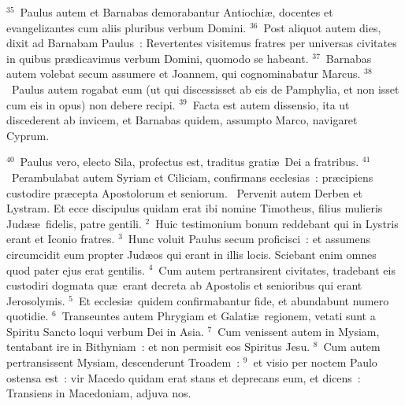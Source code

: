 ${}^{35}$~Paulus autem et Barnabas demorabantur Antiochi\ae , docentes et evangelizantes cum aliis pluribus verbum Domini.
${}^{36}$~Post aliquot autem dies, dixit ad Barnabam Paulus~: Revertentes visitemus fratres per universas civitates in quibus pr\ae dicavimus verbum Domini, quomodo se habeant.
${}^{37}$~Barnabas autem volebat secum assumere et Joannem, qui cognominabatur Marcus.
${}^{38}$~Paulus autem rogabat eum (ut qui discessisset ab eis de Pamphylia, et non isset cum eis in opus) non debere recipi.
${}^{39}$~Facta est autem dissensio, ita ut discederent ab invicem, et Barnabas quidem, assumpto Marco, navigaret Cyprum.


${}^{40}$~Paulus vero, electo Sila, profectus est, traditus grati\ae\ Dei a fratribus.
${}^{41}$~Perambulabat autem Syriam et Ciliciam, confirmans ecclesias~: pr\ae cipiens custodire pr\ae cepta Apostolorum et seniorum.
~\lettrine[lines=10,image=true,loversize=0.05,lraise=-0.03]{P}{}ervenit autem Derben et Lystram. Et ecce discipulus quidam erat ibi nomine Timotheus, filius mulieris Jud\ae \ae\ fidelis, patre gentili.
${}^{2}$~Huic testimonium bonum reddebant qui in Lystris erant et Iconio fratres.
${}^{3}$~Hunc voluit Paulus secum proficisci~: et assumens circumcidit eum propter Jud\ae os qui erant in illis locis. Sciebant enim omnes quod pater ejus erat gentilis.
${}^{4}$~Cum autem pertransirent civitates, tradebant eis custodiri dogmata qu\ae\ erant decreta ab Apostolis et senioribus qui erant Jerosolymis.
${}^{5}$~Et ecclesi\ae\ quidem confirmabantur fide, et abundabunt numero quotidie.
${}^{6}$~Transeuntes autem Phrygiam et Galati\ae\ regionem, vetati sunt a Spiritu Sancto loqui verbum Dei in Asia.
${}^{7}$~Cum venissent autem in Mysiam, tentabant ire in Bithyniam~: et non permisit eos Spiritus Jesu.
${}^{8}$~Cum autem pertransissent Mysiam, descenderunt Troadem~:
${}^{9}$~et visio per noctem Paulo ostensa est~: vir Macedo quidam erat stans et deprecans eum, et dicens~: Transiens in Macedoniam, adjuva nos.


